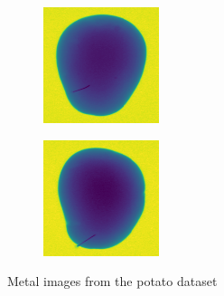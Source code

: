\documentclass[11pt]{article}
\begin{document}
\begin{figure}[!h]
\begin{subfigure}[b]{0.22\textwidth}
         \caption{}
         \label{fig:metal_41}
     \end{subfigure}
     \hfill
     \begin{subfigure}[b]{0.22\textwidth}
         \centering
         \includegraphics[width=\textwidth]{figurer/potato_dataset/metal/metal_42.jpg}
         \caption{}
         \label{fig:metal_42}
     \end{subfigure}
     \hfill
     \begin{subfigure}[b]{0.22\textwidth}
         \centering
         \includegraphics[width=\textwidth]{figurer/potato_dataset/metal/metal_43.jpg}
         \caption{}
         \label{fig:metal_43}
     \end{subfigure}
    \caption{Metal images from the potato dataset}
\end{figure}
\end{document}
